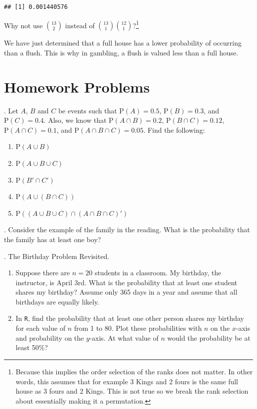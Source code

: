 \documentclass[
]{book}
\providecommand{\tightlist}{%
  \setlength{\itemsep}{0pt}\setlength{\parskip}{0pt}}
\begin{document}
\begin{verbatim}
## [1] 0.001440576
\end{verbatim}

Why not use \(\binom{13}{2}\) instead of \(\binom{13}{1}\binom{12}{1}\)?\footnote{Because this implies the order selection of the ranks does not matter. In other words, this assumes that for example 3 Kings and 2 fours is the same full house as 3 fours and 2 Kings. This is not true so we break the rank selection about essentially making it a permutation.}

We have just determined that a full house has a lower probability of occurring than a flush. This is why in gambling, a flush is valued less than a full house.

\hypertarget{homework-problems-7}{%
\section{Homework Problems}\label{homework-problems-7}}

. Let \(A\), \(B\) and \(C\) be events such that \(\mbox{P}(A)=0.5\), \(\mbox{P}(B)=0.3\), and \(\mbox{P}(C)=0.4\). Also, we know that \(\mbox{P}(A \cap B)=0.2\), \(\mbox{P}(B \cap C)=0.12\), \(\mbox{P}(A \cap C)=0.1\), and \(\mbox{P}(A \cap B \cap C)=0.05\). Find the following:

\begin{enumerate}
\def\labelenumi{\alph{enumi}.}
\tightlist
\item
  \(\mbox{P}(A\cup B)\)\\
\item
  \(\mbox{P}(A\cup B \cup C)\)\\
\item
  \(\mbox{P}(B'\cap C')\)\\
\item
  \(\mbox{P}(A\cup (B\cap C))\)\\
\item
  \(\mbox{P}((A\cup B \cup C)\cap (A\cap B \cap C)')\)
\end{enumerate}

. Consider the example of the family in the reading. What is the probability that the family has at least one boy?

. The Birthday Problem Revisited.

\begin{enumerate}
\def\labelenumi{\alph{enumi}.}
\tightlist
\item
  Suppose there are \(n=20\) students in a classroom. My birthday, the instructor, is April 3rd. What is the probability that at least one student shares my birthday? Assume only 365 days in a year and assume that all birthdays are equally likely.\\
\item
  In \texttt{R}, find the probability that at least one other person shares my birthday for each value of \(n\) from 1 to 80. Plot these probabilities with \(n\) on the \(x\)-axis and probability on the \(y\)-axis. At what value of \(n\) would the probability be at least 50\%?
\end{enumerate}
\end{document}

